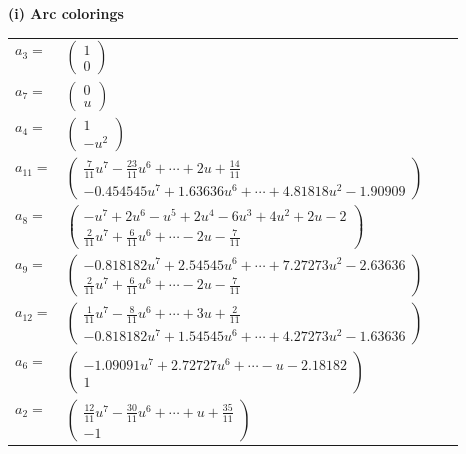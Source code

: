 \documentclass[1p]{elsarticle_modified}
\theoremstyle{definition}
\begin{document}
\flushleft \textbf{(i) Arc colorings}\\
\begin{tabular}{m{7pt} m{180pt} m{7pt} m{180pt} }
\flushright $a_{3}=$&$\begin{pmatrix}1\\0\end{pmatrix}$ \\
\flushright $a_{7}=$&$\begin{pmatrix}0\\u\end{pmatrix}$ \\
\flushright $a_{4}=$&$\begin{pmatrix}1\\- u^2\end{pmatrix}$ \\
\flushright $a_{11}=$&$\begin{pmatrix}\frac{7}{11} u^7-\frac{23}{11} u^6+\cdots+2 u+\frac{14}{11}\\-0.454545 u^{7}+1.63636 u^{6}+\cdots+4.81818 u^{2}-1.90909\end{pmatrix}$ \\
\flushright $a_{8}=$&$\begin{pmatrix}- u^7+2 u^6- u^5+2 u^4-6 u^3+4 u^2+2 u-2\\\frac{2}{11} u^7+\frac{6}{11} u^6+\cdots-2 u-\frac{7}{11}\end{pmatrix}$ \\
\flushright $a_{9}=$&$\begin{pmatrix}-0.818182 u^{7}+2.54545 u^{6}+\cdots+7.27273 u^{2}-2.63636\\\frac{2}{11} u^7+\frac{6}{11} u^6+\cdots-2 u-\frac{7}{11}\end{pmatrix}$ \\
\flushright $a_{12}=$&$\begin{pmatrix}\frac{1}{11} u^7-\frac{8}{11} u^6+\cdots+3 u+\frac{2}{11}\\-0.818182 u^{7}+1.54545 u^{6}+\cdots+4.27273 u^{2}-1.63636\end{pmatrix}$ \\
\flushright $a_{6}=$&$\begin{pmatrix}-1.09091 u^{7}+2.72727 u^{6}+\cdots-u-2.18182\\1\end{pmatrix}$ \\
\flushright $a_{2}=$&$\begin{pmatrix}\frac{12}{11} u^7-\frac{30}{11} u^6+\cdots+u+\frac{35}{11}\\-1\end{pmatrix}$ \\

\end{tabular}
\end{document}
